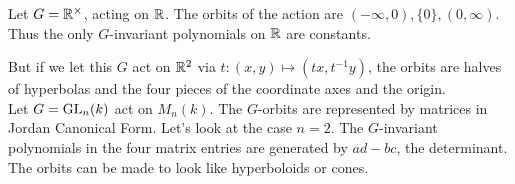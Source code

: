 \documentclass{amsart}
\begin{document}
Let $G = \mathbb{R}^{\times}$, acting on $\mathbb{R}$. The orbits of the action are $(-\infty,0),\{0\},(0,\infty)$. Thus the only $G$-invariant polynomials on $\mathbb{R}$ are constants.

But if we let this $G$ act on $\mathbb{R}^2$ via $t:(x,y)\mapsto (tx,t^{-1}y)$, the orbits are halves of hyperbolas and the four pieces of the coordinate axes and the origin.\\

Let $G=\operatorname{GL}_n(k)$ act on $M_n(k)$. The $G$-orbits are represented by matrices in Jordan Canonical Form. Let's look at the case $n=2$. The $G$-invariant polynomials in the four matrix entries are generated by $ad-bc$, the determinant. The orbits can be made to look like hyperboloids or cones.
\end{document}
